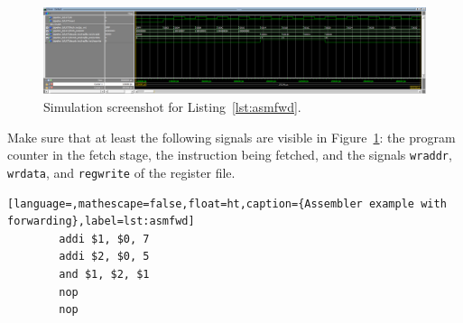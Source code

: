
\begin{figure}[ht!]
  \centering
  \includegraphics[width=1.0\linewidth]{screenshots/forward.PNG}
  \caption{Simulation screenshot for Listing~\ref{lst:asmfwd}.}
  \label{fig:sim1}
\end{figure}

Make sure that at least the following signals are visible in
Figure~\ref{fig:sim1}: the program counter in the fetch stage, the
instruction being fetched, and the signals \texttt{wraddr},
\texttt{wrdata}, and \texttt{regwrite} of the register file.

\begin{lstlisting}[language=,mathescape=false,float=ht,caption={Assembler example with forwarding},label=lst:asmfwd]
        addi $1, $0, 7
        addi $2, $0, 5
        and $1, $2, $1
        nop
        nop
\end{lstlisting}

